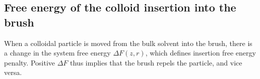 \documentclass[12pt, a4paper]{article}
\begin{document}





\subsection{Free energy of the colloid insertion into the brush}




When a colloidal particle is moved from the bulk solvent into the brush, there is a change in the system free energy $\Delta F(z,r)$, which defines insertion free energy penalty. 
Positive $\Delta F$ thus implies that the brush repels the particle, and vice versa.
\end{document}
